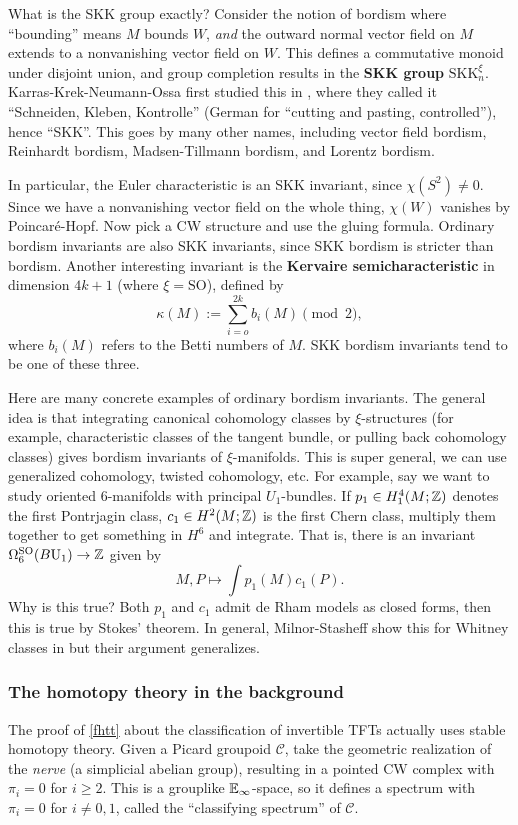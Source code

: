 What is the SKK group exactly? Consider the notion of bordism where ``bounding'' means $M$ bounds $W$, \emph{and} the outward normal vector field on $M$ extends to a nonvanishing vector field on $W$. This defines a commutative monoid under disjoint union, and group completion results in the \textbf{SKK group} $\mathrm{SK K}_n ^{\xi}$. Karras-Krek-Neumann-Ossa first studied this in \cite{kkno}, where they called it ``Schneiden, Kleben, Kontrolle'' (German for ``cutting and pasting, controlled''), hence ``SKK''. This goes by many other names, including vector field bordism, Reinhardt bordism, Madsen-Tillmann bordism, and Lorentz bordism.

In particular, the Euler characteristic is an SKK invariant, since $\chi(S^2)\neq 0$. Since we have a nonvanishing vector field on the whole thing, $\chi(W)$ vanishes by Poincar\'e-Hopf. Now pick a CW structure and use the gluing formula. Ordinary bordism invariants are also SKK invariants, since SKK bordism is stricter than bordism. Another interesting invariant is the \textbf{Kervaire semicharacteristic} in dimension $4k+1$ (where $\xi=\mathrm{SO}$), defined by \[
    \kappa(M):= \sum_{i=o}^{2k} b_i (M) \pmod 2,
\] where $b_i (M)$ refers to the Betti numbers of $M$. SKK bordism invariants tend to be one of these three.

Here are many concrete examples of ordinary bordism invariants. The general idea is that integrating canonical cohomology classes by $\xi$-structures (for example, characteristic classes of the tangent bundle, or pulling back cohomology classes) gives bordism invariants of $\xi$-manifolds. This is super general, we can use generalized cohomology, twisted cohomology, etc. For example, say we want to study oriented 6-manifolds with principal  $U_1$-bundles. If $p_1 \in H_1^4(M;\mathbb{Z})$ denotes the first Pontrjagin class, $c_1 \in H^2(M;\mathbb{Z})$ is the first Chern class, multiply them together to get something in $H^6$ and integrate. That is, there is an invariant $\Omega_6^{\mathrm{SO}}(B \mathrm{U}_1) \to \mathbb{Z}$ given by \[
    M,P \mapsto \int p_1(M)c_1(P).
\] Why is this true? Both $p_1$ and $c_1$ admit de Rham models as closed forms, then this is true by Stokes' theorem. In general, Milnor-Stasheff show this for Whitney classes in \cite{cc} but their argument generalizes.

\subsubsection*{The homotopy theory in the background} 
The proof of \cref{fhtt} about the classification of invertible TFTs actually uses stable homotopy theory. Given a Picard groupoid $\mathcal{C} $, take the geometric realization of the \emph{nerve} (a simplicial abelian group), resulting in a pointed CW complex with $\pi_i =0$ for $i \geq 2$. This is a grouplike $\mathbb{E}_{\infty}$-space, so it defines a spectrum with $\pi_i =0$ for $i\neq 0,1$, called the ``classifying spectrum'' of $\mathcal{C} $.

